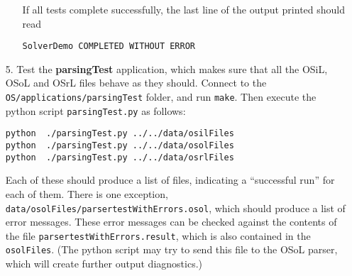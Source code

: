 \begin{itemize}
\begin{itemize}
If all tests complete successfully, the last line of the output printed should read
\begin{verbatim}
SolverDemo COMPLETED WITHOUT ERROR
\end{verbatim}

\end{itemize}


\iffalse
\item[b.] Test the {\bf OSFileUpload} application.    Edit  {\bf OSFileUpload.cpp}. First comment out line 79 and then modify line 
\begin{verbatim}
osagent = new OSSolverAgent("http://******/os/servlet/OSFileUpload");
\end{verbatim}
to
{\small
\begin{verbatim}
osagent = new OSSolverAgent("http://gsbkip.chicagogsb.edu/os/servlet/OSFileUpload");
\end{verbatim}
}
Rebuild and run. This application takes one command line argument which is the file to be uploaded. 
\fi

\item[5.] Test the {\bf parsingTest} application, which makes sure that all the OSiL, OSoL and OSrL files behave as they should. Connect to the {\tt OS/applications/parsingTest} folder, and run {\tt make}.  Then execute the python script {\tt parsingTest.py} as follows:  

\begin{verbatim}
python  ./parsingTest.py ../../data/osilFiles
python  ./parsingTest.py ../../data/osolFiles
python  ./parsingTest.py ../../data/osrlFiles
\end{verbatim}

Each of these should produce a list of files, indicating a ``successful run'' for each of them. There is one exception, {\tt data/osolFiles/parsertestWithErrors.osol}, which should produce a list of error messages. These error messages can be checked against the contents of the file 
{\tt parsertestWithErrors.result}, which is also contained in the {\tt osolFiles}. (The python script may try to send this file to the OSoL parser, which will create further output diagnostics.)
\end{itemize}



